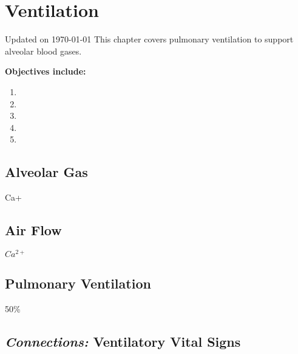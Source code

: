 \chapter{Ventilation}\label{chp:alveolar_oxygen}
Updated on \today
\minitoc
This chapter covers pulmonary ventilation to support alveolar blood gases.

\vspace{5mm}

\textbf{Objectives include:}
\begin{enumerate}
    \item
    \item
    \item
    \item
    \item
\end{enumerate}

\section{Alveolar Gas}
Ca+
\section{Air Flow}
$Ca^{2+}$
\section{Pulmonary Ventilation}
50\%
\section{\textit{Connections:} Ventilatory Vital Signs}

\printbibliography[heading=subbibintoc]